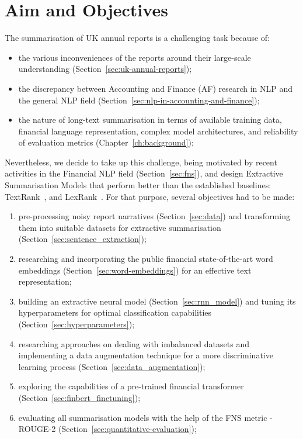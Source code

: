 \section{Aim and Objectives}\label{sec:aim-and-objectives}
The summarisation of UK annual reports is a challenging task because of:
 \begin{itemize}
     \item the various inconveniences of the reports around their large-scale understanding (Section~\ref{sec:uk-annual-reports});
     \item the discrepancy between Accounting and Finance (AF) research in NLP and the general NLP field (Section~\ref{sec:nlp-in-accounting-and-finance});
     \item the nature of long-text summarisation in terms of available training data, financial language representation, complex model architectures, and reliability of evaluation metrics (Chapter~\ref{ch:background});
 \end{itemize}
 Nevertheless, we decide to take up this challenge, being motivated by recent activities in the Financial NLP field
(Section~\ref{sec:fns}), and design Extractive Summarisation Models that perform better than the established baselines: TextRank~\cite{mihalcea-tarau-2004-textrank}, and LexRank~\cite{Erkan2004LexRankGC}.
 For that purpose, several objectives had to be made:
 \begin{enumerate}
     \item pre-processing noisy report narratives (Section~\ref{sec:data}) and transforming them into suitable datasets for extractive summarisation (Section~\ref{sec:sentence_extraction});
     \item researching and incorporating the public financial state-of-the-art word embeddings (Section~\ref{sec:word-embeddings}) for an effective text representation;
     \item building an extractive neural model (Section~\ref{sec:rnn_model}) and tuning its hyperparameters for optimal classification capabilities (Section~\ref{sec:hyperparameters});
     \item researching approaches on dealing with imbalanced datasets and implementing a data augmentation technique for a more discriminative learning process (Section~\ref{sec:data_augmentation});
     \item exploring the capabilities of a pre-trained financial transformer (Section~\ref{sec:finbert_finetuning});
     \item evaluating all summarisation models with the help of the FNS metric - ROUGE-2 (Section~\ref{sec:quantitative-evaluation});
 \end{enumerate}

